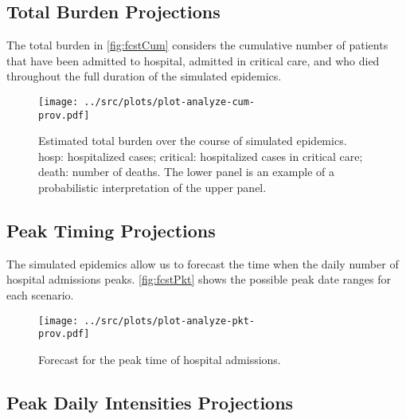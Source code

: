 \documentclass[10pt]{article}
\begin{document}




\newpage

\subsection*{Total Burden Projections}



The total burden in \autoref{fig:fcstCum} considers the cumulative number of patients that have been admitted to hospital, admitted in critical care, and who died throughout the full duration of the simulated epidemics.

\begin{figure}[h!]
\begin{center}
\texttt{[image: ../src/plots/plot-analyze-cum-\\prov.pdf]}
\caption{Estimated total burden over the course of simulated epidemics. \textsf{hosp}: hospitalized cases; \textsf{critical}: hospitalized cases in critical care; \textsf{death}: number of deaths. The lower panel is an example of a  probabilistic interpretation of the upper panel.}
\label{fig:fcstCum}
\end{center}
\end{figure}


\newpage 

\subsection*{Peak Timing Projections}



The simulated epidemics allow us to forecast the time when the daily number of hospital admissions peaks. \autoref{fig:fcstPkt} shows the possible peak date ranges for each scenario.

\begin{figure}[h!]
\begin{center}
\texttt{[image: ../src/plots/plot-analyze-pkt-\\prov.pdf]}
\caption{Forecast for the peak time of hospital admissions.}
\label{fig:fcstPkt}
\end{center}
\end{figure}

\newpage

\subsection*{Peak Daily Intensities Projections}
\end{document}
